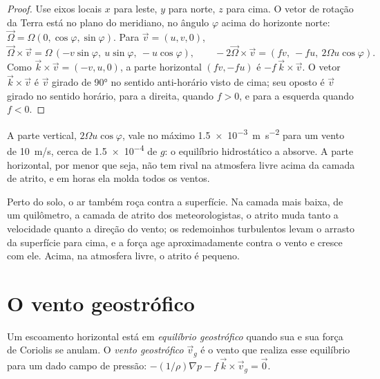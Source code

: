 \begin{proof}
Use eixos locais $x$ para leste, $y$ para norte, $z$ para cima. O vetor de rotação da Terra está no
plano do meridiano, no ângulo $\varphi$ acima do horizonte norte: $\vec\Omega =
\Omega(0, \cos\varphi, \sin\varphi)$. Para $\vec v = (u, v, 0)$,
\[
  \vec\Omega\times\vec v = \Omega\,(-v\sin\varphi,\ u\sin\varphi,\ -u\cos\varphi),
  \qquad -2\vec\Omega\times\vec v = (f v,\ -f u,\ 2\Omega u\cos\varphi).
\]
Como $\vec k\times\vec v = (-v, u, 0)$, a parte horizontal $(fv, -fu)$ é $-f\,\vec k\times\vec v$. O
vetor $\vec k\times\vec v$ é $\vec v$ girado de \ang{90} no sentido anti-horário visto de cima; seu
oposto é $\vec v$ girado no sentido horário, para a direita, quando $f > 0$, e para a esquerda quando
$f < 0$.
\end{proof}

A parte vertical, $2\Omega u\cos\varphi$, vale no máximo \qty{1.5e-3}{m.s^{-2}} para um vento de
\qty{10}{m/s}, cerca de \num{1.5e-4} de $g$: o equilíbrio hidrostático a absorve. A parte horizontal,
por menor que seja, não tem rival na atmosfera livre acima da camada de atrito, e em horas ela molda
todos os ventos.

Perto do solo, o ar também roça contra a superfície. Na camada mais baixa, de um quilômetro, a
camada de atrito dos meteorologistas, o atrito muda tanto a velocidade quanto a direção do vento;
os redemoinhos turbulentos levam o arrasto da superfície para cima, e a força age aproximadamente
contra o vento e cresce com ele. Acima, na atmosfera livre, o atrito é pequeno.

\section{O vento geostrófico}\label{sec:b1:atmospheric-circulation:geostrophic}

\begin{definition}\label{def:b1:atmospheric-circulation:geostrophic}
Um escoamento horizontal está em \emph{equilíbrio geostrófico} quando
sua  e sua força de Coriolis se anulam. O \emph{vento geostrófico}
$\vec v_g$ é o vento que realiza esse equilíbrio para um dado campo de pressão: $-(1/\rho)\nabla p - f\,\vec k\times\vec v_g = \vec 0$.
\end{definition}

